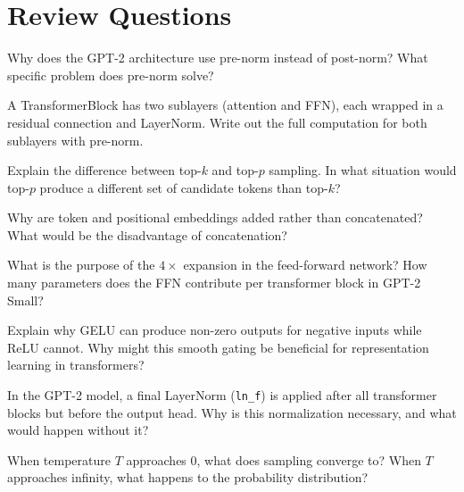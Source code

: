 \section*{Review Questions}

\begin{reviewquestion}[1]
  Why does the GPT-2 architecture use pre-norm instead of post-norm?
  What specific problem does pre-norm solve?
\end{reviewquestion}

\begin{reviewquestion}[2]
  A TransformerBlock has two sublayers (attention and FFN), each wrapped
  in a residual connection and LayerNorm. Write out the full computation
  for both sublayers with pre-norm.
\end{reviewquestion}

\begin{reviewquestion}[3]
  Explain the difference between top-$k$ and top-$p$ sampling. In what
  situation would top-$p$ produce a different set of candidate tokens
  than top-$k$?
\end{reviewquestion}

\begin{reviewquestion}[4]
  Why are token and positional embeddings added rather than concatenated?
  What would be the disadvantage of concatenation?
\end{reviewquestion}

\begin{reviewquestion}[5]
  What is the purpose of the $4\times$ expansion in the feed-forward network?
  How many parameters does the FFN contribute per transformer block in
  GPT-2 Small?
\end{reviewquestion}

\begin{reviewquestion}[6]
  Explain why GELU can produce non-zero outputs for negative inputs while ReLU
  cannot. Why might this smooth gating be beneficial for representation
  learning in transformers?
\end{reviewquestion}

\begin{reviewquestion}[7]
  In the GPT-2 model, a final LayerNorm (\texttt{ln\_f}) is applied after all
  transformer blocks but before the output head. Why is this normalization
  necessary, and what would happen without it?
\end{reviewquestion}

\begin{reviewquestion}[8]
  When temperature $T$ approaches 0, what does sampling converge to? When
  $T$ approaches infinity, what happens to the probability distribution?
\end{reviewquestion}

